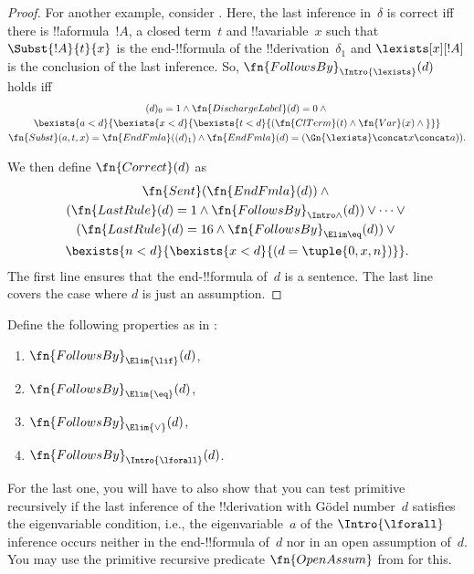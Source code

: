 \documentclass[../../../include/open-logic-section]{subfiles}
\begin{document}
\begin{proof}
  For another example, consider \Intro{\lexists}.  Here, the last
  inference in~$\delta$ is correct iff there is !!a{formula}~$!A$, a
  closed term~$t$ and !!a{variable}~$x$ such that $\Subst{!A}{t}{x}$
  is the end-!!{formula} of the !!{derivation}~$\delta_1$ and
  $\lexists[x][!A]$ is the conclusion of the last inference.  So,
  $\fn{FollowsBy}_{\Intro{\lexists}}(d)$ holds iff
  \begin{multline*}
    (d)_0 = 1 \land \fn{DischargeLabel}(d) = 0 \land {} \\
    \bexists{a < d}{\bexists{x<d}{\bexists{t<d}{
          (\fn{ClTerm}(t) \land \fn{Var}(x)  \land {}}}}\\
    \fn{Subst}(a,t,x) = \fn{EndFmla}((d)_1) \land
    \fn{EndFmla}(d) = (\Gn{\lexists} \concat x \concat a)).
  \end{multline*}

  We then define $\fn{Correct}(d)$ as
  \begin{multline*}
    \fn{Sent}(\fn{EndFmla}(d)) \land {}\\
    (\fn{LastRule}(d) = 1 \land
    \fn{FollowsBy}_{\Intro\land}(d)) \lor \dots \lor {}\\
    (\fn{LastRule}(d) = 16 \land \fn{FollowsBy}_{\Elim\eq}(d)) \lor {}\\
    \bexists{n<d}{\bexists{x<d}{(d = \tuple{0, x, n})}}.
  \end{multline*}
  The first line ensures that the end-!!{formula} of~$d$ is a
  sentence. The last line covers the case where $d$ is just an
  assumption.
\end{proof}

\begin{prob}
  Define the following properties as in
  :
  \begin{enumerate}
  \item $\fn{FollowsBy}_{\Elim{\lif}}(d)$,
  \item $\fn{FollowsBy}_{\Elim{\eq}}(d)$,
  \item $\fn{FollowsBy}_{\Elim{\lor}}(d)$,
  \item $\fn{FollowsBy}_{\Intro{\lforall}}(d)$.
  \end{enumerate}
  For the last one, you will have to also show that you can test
  primitive recursively if the last inference of the
  !!{derivation} with G\"odel number~$d$ satisfies the eigenvariable
  condition, i.e., the eigenvariable~$a$ of the $\Intro{\lforall}$
  inference occurs neither in the end-!!{formula} of~$d$ nor in an
  open assumption of~$d$. You may use the primitive recursive
  predicate $\fn{OpenAssum}$ from
   for this.
\end{prob}
\end{document}
